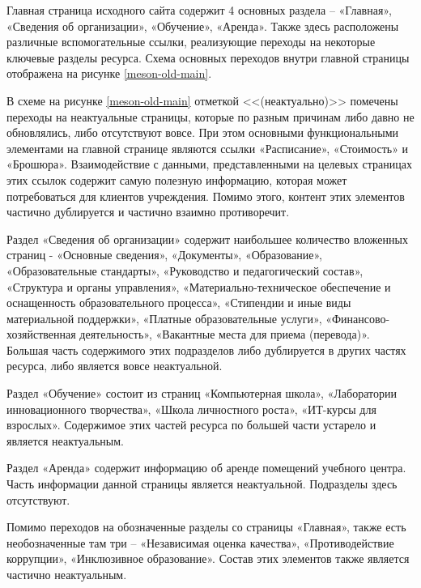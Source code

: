 Главная страница исходного сайта содержит 4 основных раздела -- «Главная», «Сведения об организации», «Обучение», «Аренда».
Также здесь расположены различные вспомогательные ссылки, реализующие переходы на некоторые ключевые разделы ресурса.
Схема основных переходов внутри главной страницы отображена на рисунке \ref{meson-old-main}.


В схеме на рисунке \ref{meson-old-main} отметкой <<(неактуально)>> помечены переходы на неактуальные страницы, которые по разным причинам либо давно не обновлялись, либо отсутствуют вовсе.
При этом основными функциональными элементами на главной странице являются ссылки «Расписание», «Стоимость» и «Брошюра».
Взаимодействие с данными, представленными на целевых страницах этих ссылок содержит самую полезную информацию, которая может потребоваться для клиентов учреждения.
Помимо этого, контент этих элементов частично дублируется и частично взаимно противоречит.

Раздел «Сведения об организации» содержит наибольшее количество вложенных страниц - «Основные сведения», «Документы», «Образование», «Образовательные стандарты», «Руководство и педагогический состав», «Структура и органы управления», «Материально-техническое обеспечение и оснащенность образовательного процесса», «Стипендии и иные виды материальной поддержки», «Платные образовательные услуги», «Финансово-хозяйственная деятельность», «Вакантные места для приема (перевода)».
Большая часть содержимого этих подразделов либо дублируется в других частях ресурса, либо является вовсе неактуальной.

Раздел «Обучение» состоит из страниц «Компьютерная школа», «Лаборатории инновационного творчества», «Школа личностного роста», «ИТ-курсы для взрослых».
Содержимое этих частей ресурса по большей части устарело и является неактуальным.

Раздел «Аренда» содержит информацию об аренде помещений учебного центра.
Часть информации данной страницы является неактуальной.
Подразделы здесь отсутствуют.

Помимо переходов на обозначенные разделы со страницы «Главная», также есть необозначенные там три -- «Независимая оценка качества», «Противодействие коррупции», «Инклюзивное образование».
Состав этих элементов также является частично неактуальным.


